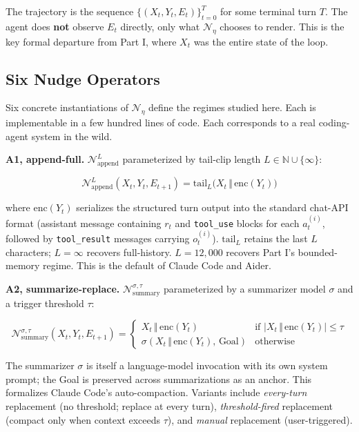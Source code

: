 \documentclass{article}
\theoremstyle{plain}
\theoremstyle{definition}
\begin{document}
The trajectory is the sequence $\{(X_t, Y_t, E_t)\}_{t=0}^{T}$ for some terminal turn $T$. The agent does \textbf{not} observe $E_t$ directly, only what $\mathcal{N}_\eta$ chooses to render. This is the key formal departure from Part I, where $X_t$ was the entire state of the loop.

\subsection{Six Nudge Operators}

Six concrete instantiations of $\mathcal{N}_\eta$ define the regimes studied here. Each is implementable in a few hundred lines of code. Each corresponds to a real coding-agent system in the wild.

\textbf{A1, append-full.} $\mathcal{N}_\text{append}^L$ parameterized by tail-clip length $L \in \mathbb{N} \cup \{\infty\}$:

\begin{equation*}
\mathcal{N}_\text{append}^L(X_t, Y_t, E_{t+1}) = \mathrm{tail}_L\bigl(X_t \,\Vert\, \mathrm{enc}(Y_t)\bigr)
\end{equation*}

where $\mathrm{enc}(Y_t)$ serializes the structured turn output into the standard chat-API format (assistant message containing $r_t$ and \texttt{tool\_use} blocks for each $a_t^{(i)}$, followed by \texttt{tool\_result} messages carrying $o_t^{(i)}$). $\mathrm{tail}_L$ retains the last $L$ characters; $L = \infty$ recovers full-history. $L = 12{,}000$ recovers Part I's bounded-memory regime. This is the default of Claude Code and Aider.

\textbf{A2, summarize-replace.} $\mathcal{N}_\text{summary}^{\sigma, \tau}$ parameterized by a summarizer model $\sigma$ and a trigger threshold $\tau$:

\begin{equation*}
\mathcal{N}_\text{summary}^{\sigma, \tau}(X_t, Y_t, E_{t+1}) = \begin{cases}
X_t \,\Vert\, \mathrm{enc}(Y_t) & \text{if } |X_t \,\Vert\, \mathrm{enc}(Y_t)| \le \tau \\
\sigma(X_t \,\Vert\, \mathrm{enc}(Y_t),\, \text{Goal}) & \text{otherwise}
\end{cases}
\end{equation*}

The summarizer $\sigma$ is itself a language-model invocation with its own system prompt; the Goal is preserved across summarizations as an anchor. This formalizes Claude Code's auto-compaction. Variants include \textit{every-turn} replacement (no threshold; replace at every turn), \textit{threshold-fired} replacement (compact only when context exceeds $\tau$), and \textit{manual} replacement (user-triggered).
\end{document}
